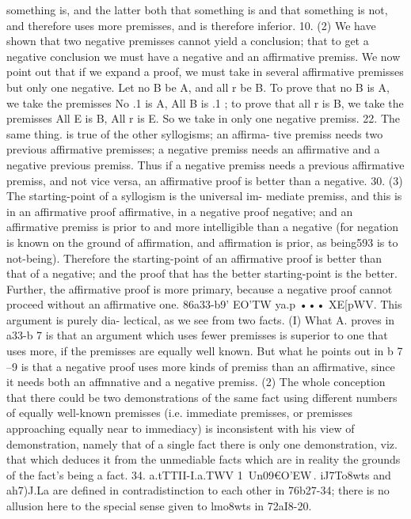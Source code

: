 {{{{{{{{{{{{{{{{{{{{{{{{{{{{{{{{{{something is, and the latter both that something is and that
something is not, and therefore uses more premisses, and is
therefore inferior.
10. (2) We have shown that two negative premisses cannot
yield a conclusion; that to get a negative conclusion we must
have a negative and an affirmative premiss. We now point out
that if we expand a proof, we must take in several affirmative
premisses but only one negative. Let no B be A, and all r be B.
To prove that no B is A, we take the premisses No .1 is A, All
B is .1 ; to prove that all r is B, we take the premisses All E is B,
All r is E. So we take in only one negative premiss.
22. The same thing. is true of the other syllogisms; an affirma-
tive premiss needs two previous affirmative premisses; a negative
premiss needs an affirmative and a negative previous premiss.
Thus if a negative premiss needs a previous affirmative premiss,
and not vice versa, an affirmative proof is better than a negative.
30. (3) The starting-point of a syllogism is the universal im-
mediate premiss, and this is in an affirmative proof affirmative,
in a negative proof negative; and an affirmative premiss is prior
to and more intelligible than a negative (for negation is known
on the ground of affirmation, and affirmation is prior, as being593
is to not-being). Therefore the starting-point of an affirmative
proof is better than that of a negative; and the proof that has
the better starting-point is the better. Further, the affirmative
proof is more primary, because a negative proof cannot proceed
without an affirmative one.
86a33-b9' EO'TW ya.p ••• XE[pWV. This argument is purely dia-
lectical, as we see from two facts. (I) What A. proves in a33-b 7 is
that an argument which uses fewer premisses is superior to one
that uses more, if the premisses are equally well known. But
what he points out in b 7 --9 is that a negative proof uses more
kinds of premiss than an affirmative, since it needs both an
affmnative and a negative premiss. (2) The whole conception
that there could be two demonstrations of the same fact using
different numbers of equally well-known premisses (i.e. immediate
premisses, or premisses approaching equally near to immediacy)
is inconsistent with his view of demonstration, namely that of
a single fact there is only one demonstration, viz. that which
deduces it from the unmediable facts which are in reality the
grounds of the fact's being a fact.
34. a.tTTII-I.a.TWV 1\ Un09€O'EW\,. iJ7To8wts and ah7)J.La are defined
in contradistinction to each other in 76b27-34; there is no allusion
here to the special sense given to lmo8wts in 72aI8-20.
}}}}}}}}}}}}}}}}}}}}}}}}}}}}}}}}}}
